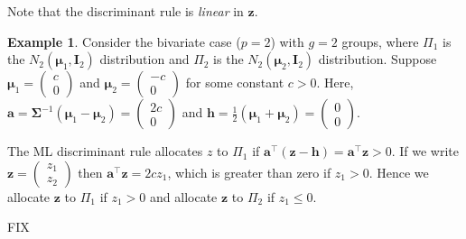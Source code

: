 \documentclass[]{book}
\theoremstyle{definition}
\theoremstyle{definition}
\newtheorem{example}{Example}[chapter]
\theoremstyle{definition}
\theoremstyle{remark}
\begin{document}
Note that the discriminant rule is \emph{linear} in \(\boldsymbol z\).

\begin{example}
\protect\hypertarget{exm:exnine2}{}{\label{exm:exnine2} }Consider the bivariate case (\(p=2\)) with \(g=2\) groups, where \(\Pi_1\) is the \(N_2(\boldsymbol \mu_1,\boldsymbol I_2)\) distribution and \(\Pi_2\) is the \(N_2(\boldsymbol \mu_2,\boldsymbol I_2)\) distribution. Suppose \(\boldsymbol \mu_1 = \begin{pmatrix} c \\ 0 \end{pmatrix}\) and \(\boldsymbol \mu_2 = \begin{pmatrix} -c \\ 0 \end{pmatrix}\) for some constant \(c>0\). Here, \(\boldsymbol a= \boldsymbol \Sigma^{-1} (\boldsymbol \mu_1 - \boldsymbol \mu_2) = \begin{pmatrix} 2c \\ 0 \end{pmatrix}\) and \(\boldsymbol h= \frac{1}{2}( \boldsymbol \mu_1 + \boldsymbol \mu_2 ) = \begin{pmatrix} 0 \\ 0 \end{pmatrix}\).

The ML discriminant rule allocates \(z\) to \(\Pi_1\) if \(\boldsymbol a^\top (\boldsymbol z- \boldsymbol h) = \boldsymbol a^\top \boldsymbol z> 0\). If we write \(\boldsymbol z= \begin{pmatrix} z_1 \\ z_2 \end{pmatrix}\) then \(\boldsymbol a^\top \boldsymbol z= 2cz_1\), which is greater than zero if \(z_1 > 0\). Hence we allocate \(\boldsymbol z\) to \(\Pi_1\) if \(z_1 > 0\) and allocate \(\boldsymbol z\) to \(\Pi_2\) if \(z_1 \leq 0\).

FIX
\end{example}
\end{document}
